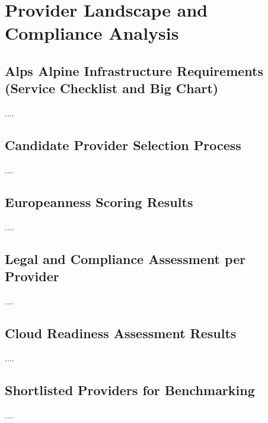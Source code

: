 \chapter{Provider Landscape and Compliance Analysis}

\section{Alps Alpine Infrastructure Requirements (Service Checklist and Big Chart)}
....

\section{Candidate Provider Selection Process}
....
\section{Europeanness Scoring Results}
....
\section{Legal and Compliance Assessment per Provider}
....
\section{Cloud Readiness Assessment Results}
....
\section{Shortlisted Providers for Benchmarking}
....
